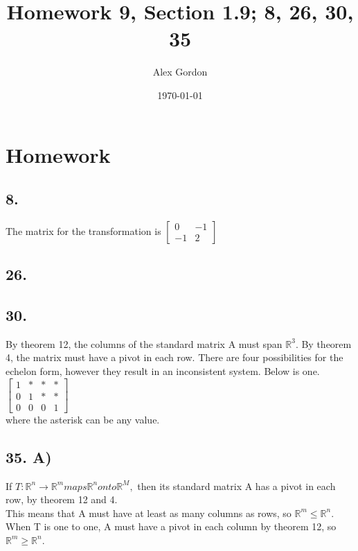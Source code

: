 \documentclass[12]{scrartcl}
\begin{document}
\title{Homework 9, Section 1.9; 8, 26, 30, 35 }
\author{Alex Gordon}
\date{\today}
\maketitle
\section*{Homework}
\subsection*{8.}
The matrix for the transformation is
$\begin{bmatrix} 0&-1 \\ -1&2  \end{bmatrix}$\\
\subsection*{26.}

\subsection*{30.}
By theorem 12, the columns of the standard matrix A must span $ \mathbb{R}^3$. 
By theorem 4, the matrix must have a pivot in each row. 
There are four possibilities for the echelon form, however they result in an inconsistent system.  Below is one. 
$\begin{bmatrix} 1& * & * & * \\ 0&1 & * & * \\ 0 & 0 & 0 & 1 \end{bmatrix}$\\ where the asterisk can be any value. 
\subsection*{35. A)}
If $ T : \mathbb{R}^n \rightarrow  \mathbb{R}^m maps  \mathbb{R}^n onto  \mathbb{R}^M, $ then its standard matrix A has a pivot in each row, by theorem 12 and 4. \\
This means that A must have at least as many columns as rows, so $ \mathbb{R}^m \leq  \mathbb{R}^n$. When T is one to one, A must have a pivot in each column by theorem 12, so $ \mathbb{R}^m \geq  \mathbb{R}^n$. 
\end{document}
